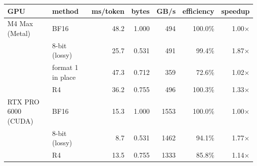 \begin{tabular}{llrrrrr}
\toprule
GPU & method & ms/token & bytes & GB/s & efficiency & speedup \\
\midrule
M4 Max (Metal) & BF16 & 48.2 & 1.000 & 494 & 100.0\% & 1.00$\times$ \\
 & 8-bit (lossy) & 25.7 & 0.531 & 491 & 99.4\% & 1.87$\times$ \\
 & format 1 in place & 47.3 & 0.712 & 359 & 72.6\% & 1.02$\times$ \\
 & R4 & 36.2 & 0.755 & 496 & 100.3\% & 1.33$\times$ \\
RTX PRO 6000 (CUDA) & BF16 & 15.3 & 1.000 & 1553 & 100.0\% & 1.00$\times$ \\
 & 8-bit (lossy) & 8.7 & 0.531 & 1462 & 94.1\% & 1.77$\times$ \\
 & R4 & 13.5 & 0.755 & 1333 & 85.8\% & 1.14$\times$ \\
\bottomrule
\end{tabular}
